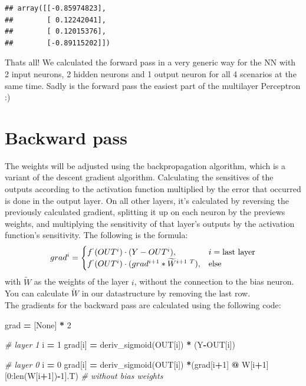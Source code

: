 \documentclass[
]{book}
\newenvironment{Shaded}{\begin{snugshade}}{\end{snugshade}}
\newcommand{\BuiltInTok}[1]{#1}
\newcommand{\CommentTok}[1]{\textcolor[rgb]{0.56,0.35,0.01}{\textit{#1}}}
\newcommand{\DecValTok}[1]{\textcolor[rgb]{0.00,0.00,0.81}{#1}}
\newcommand{\NormalTok}[1]{#1}
\newcommand{\OperatorTok}[1]{\textcolor[rgb]{0.81,0.36,0.00}{\textbf{#1}}}
\newcommand{\VariableTok}[1]{\textcolor[rgb]{0.00,0.00,0.00}{#1}}
\begin{document}
\begin{verbatim}
## array([[-0.85974823],
##        [ 0.12242041],
##        [ 0.12015376],
##        [-0.89115202]])
\end{verbatim}

Thats all! We calculated the forward pass in a very generic way for the NN with 2 input neurons, 2 hidden neurons and 1 output neuron for all 4 scenarios at the same time. Sadly is the forward pass the easiest part of the multilayer Perceptron :)

\hypertarget{backward-pass-1}{%
\section{Backward pass}\label{backward-pass-1}}

The weights will be adjusted using the backpropagation algorithm, which is a variant of the descent gradient algorithm. Calculating the sensitives of the outputs according to the activation function multiplied by the error that occurred is done in the output layer. On all other layers, it's calculated by reversing the previously calculated gradient, splitting it up on each neuron by the previews weights, and multiplying the sensitivity of that layer's outputs by the activation function's sensitivity. The following is the formula:
\[
  grad^i= 
\begin{cases}
    f^`(OUT^i) \cdot (Y-OUT^i),& i =\text{last layer}\\
    f^`(OUT^i) \cdot (grad^{i+1} * \widetilde{W}^{i+1\ T}),& \text{else}
\end{cases}
\]
with \(\widetilde{W}\) as the weights of the layer \(i\), without the connection to the bias neuron. You can calculate \(\widetilde{W}\) in our datastructure by removing the last row.\\
The gradients for the backward pass are calculated using the following code:

\begin{Shaded}
\begin{Highlighting}[]
\NormalTok{grad }\OperatorTok{=}\NormalTok{ [}\VariableTok{None}\NormalTok{] }\OperatorTok{*} \DecValTok{2}

\CommentTok{\# layer 1}
\NormalTok{i }\OperatorTok{=} \DecValTok{1}
\NormalTok{grad[i] }\OperatorTok{=}\NormalTok{ deriv\_sigmoid(OUT[i]) }\OperatorTok{*}\NormalTok{ (Y}\OperatorTok{{-}}\NormalTok{OUT[i])}

\CommentTok{\# layer 0}
\NormalTok{i }\OperatorTok{=} \DecValTok{0}
\NormalTok{grad[i] }\OperatorTok{=}\NormalTok{ deriv\_sigmoid(OUT[i]) }\OperatorTok{*}\NormalTok{(grad[i}\OperatorTok{+}\DecValTok{1}\NormalTok{] }\OperatorTok{@}\NormalTok{ W[i}\OperatorTok{+}\DecValTok{1}\NormalTok{][}\DecValTok{0}\NormalTok{:}\BuiltInTok{len}\NormalTok{(W[i}\OperatorTok{+}\DecValTok{1}\NormalTok{])}\OperatorTok{{-}}\DecValTok{1}\NormalTok{].T) }\CommentTok{\# without bias weights}
\end{Highlighting}
\end{Shaded}
\end{document}
